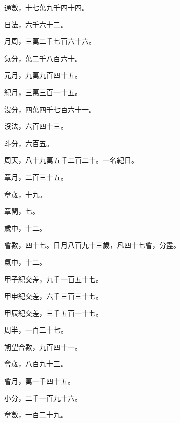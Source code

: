 \begin{pinyinscope}
 通數，十七萬九千四十四。



 日法，六千六十二。



 月周，三萬二千七百六十六。



 氣分，萬二千八百六十。



 元月，九萬九百四十五。



 紀月，三萬三百一十五。



 沒分，四萬四千七百六十一。



 沒法，六百四十三。



 斗分，六百五。



 周天，八十九萬五千二百二十。一名紀日。



 章月，二百三十五。



 章歲，十九。



 章閏，七。



 歲中，十二。



 會數，四十七。日月八百九十三歲，凡四十七會，分盡。



 氣中，十二。



 甲子紀交差，九千一百五十七。



 甲申紀交差，六千三百三十七。



 甲辰紀交差，三千五百一十七。



 周半，一百二十七。



 朔望合數，九百四十一。



 會歲，八百九十三。



 會月，萬一千四十五。



 小分，二千一百九十六。



 章數，一百二十九。




\end{pinyinscope}
